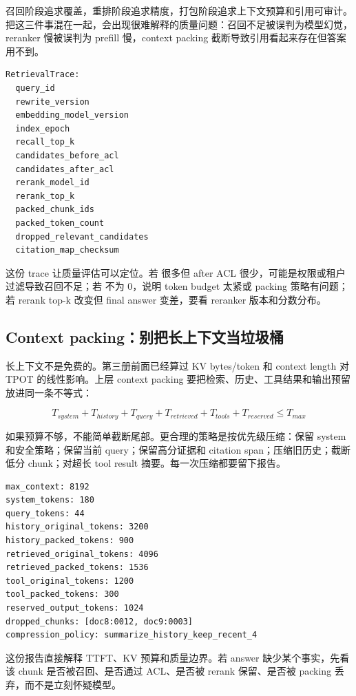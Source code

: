 召回阶段追求覆盖，重排阶段追求精度，打包阶段追求上下文预算和引用可审计。把这三件事混在一起，会出现很难解释的质量问题：召回不足被误判为模型幻觉，reranker 慢被误判为 prefill 慢，context packing 截断导致引用看起来存在但答案用不到。

\begin{lstlisting}[numbers=none,caption={RetrievalTrace 最小字段}]
RetrievalTrace:
  query_id
  rewrite_version
  embedding_model_version
  index_epoch
  recall_top_k
  candidates_before_acl
  candidates_after_acl
  rerank_model_id
  rerank_top_k
  packed_chunk_ids
  packed_token_count
  dropped_relevant_candidates
  citation_map_checksum
\end{lstlisting}

这份 trace 让质量评估可以定位。若  很多但 after ACL 很少，可能是权限或租户过滤导致召回不足；若  不为 0，说明 token budget 太紧或 packing 策略有问题；若 rerank top-k 改变但 final answer 变差，要看 reranker 版本和分数分布。

\subsection{Context packing：别把长上下文当垃圾桶}

长上下文不是免费的。第三册前面已经算过 KV bytes/token 和 context length 对 TPOT 的线性影响。上层 context packing 要把检索、历史、工具结果和输出预留放进同一条不等式：

\[
T_{system}+T_{history}+T_{query}+T_{retrieved}+T_{tools}+T_{reserved}
  \le T_{max}
\]

如果预算不够，不能简单截断尾部。更合理的策略是按优先级压缩：保留 system 和安全策略；保留当前 query；保留高分证据和 citation span；压缩旧历史；截断低分 chunk；对超长 tool result 摘要。每一次压缩都要留下报告。

\begin{lstlisting}[numbers=none,caption={ContextPackingReport}]
max_context: 8192
system_tokens: 180
query_tokens: 44
history_original_tokens: 3200
history_packed_tokens: 900
retrieved_original_tokens: 4096
retrieved_packed_tokens: 1536
tool_original_tokens: 1200
tool_packed_tokens: 300
reserved_output_tokens: 1024
dropped_chunks: [doc8:0012, doc9:0003]
compression_policy: summarize_history_keep_recent_4
\end{lstlisting}

这份报告直接解释 TTFT、KV 预算和质量边界。若 answer 缺少某个事实，先看该 chunk 是否被召回、是否通过 ACL、是否被 rerank 保留、是否被 packing 丢弃，而不是立刻怀疑模型。

